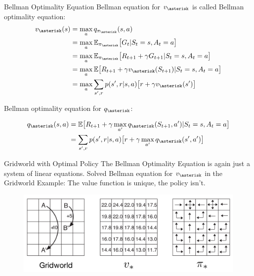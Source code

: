 \documentclass{beamer}
\begin{document}
\begin{frame}{Bellman Optimality Equation}	
	Bellman equation for $v_{\asterisk}$ is called Bellman optimality equation:
	\begin{align}
	v_{\asterisk} (s) &= \max\limits_{a} q_{\pi_{\asterisk}} (s,a) \\
	&= \max\limits_{a} \mathbb{E}_{\pi_{\asterisk}} \big[ G_t | S_t =s, A_t = a \big]\\
	&= \max\limits_{a} \mathbb{E}_{\pi_{\asterisk}} \big[ R_{t+1} + \gamma G_{t+1} | S_t =s, A_t = a \big]\\
	&= \max\limits_{a} \mathbb{E} \big[ R_{t+1} + \gamma v_{\asterisk} (S_{t+1}) | S_t =s, A_t = a \big] \label{bellopt1}\\
	&= \max\limits_{a} \sum_{s',r} p(s',r | s,a) \big[ r + \gamma v_{\asterisk} (s') \big] \label{bellopt2}
	\end{align}

Bellman optimality equation for $q_{\asterisk}$:

	\begin{align}
	q_{\asterisk} (s,a) &= \mathbb{E} \big[ R_{t+1} + \gamma \max\limits_{a'} q_{\asterisk} (S_{t+1}, a') | S_t =s, A_t = a \big] \\
	&= \sum_{s',r} p(s',r | s,a) \big[ r + \gamma  \max\limits_{a'} q_{\asterisk} (s', a') \big] 
	\end{align}

\end{frame}

\begin{frame}{Gridworld with Optimal Policy}
	The Bellman Optimality Equation is again just a system of linear equations. Solved Bellman equation for $v_{\asterisk}$ in the Gridworld Example: The value function is unique, the policy isn't.
	\begin{figure}
	\centering
	\includegraphics[width=\linewidth]{Images/gridworldoptimal.png}\\	
	\end{figure}
\end{frame}
\end{document}
